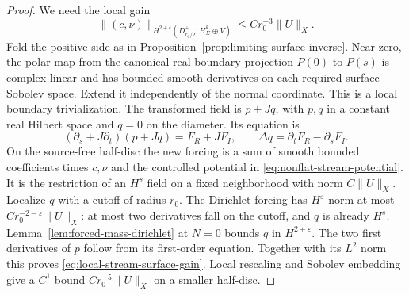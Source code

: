 \documentclass[11pt]{amsart}
\theoremstyle{definition}
\theoremstyle{remark}
\theoremstyle{plain}
\begin{document}
\begin{proof}
We need the local gain
\begin{equation}\label{eq:local-stream-surface-gain}
 \|(c,\nu)\|_{H^{2+\varepsilon}(D_{r_0/2}^+;
                                      H_\Sigma^k\oplus V)}
                                  \leq Cr_0^{-3}\|U\|_X.
\end{equation}
Fold the positive side as in
Proposition~\ref{prop:limiting-surface-inverse}.
Near zero, the polar map from the canonical real boundary
projection $P(0)$ to $P(s)$ is complex linear and has bounded
smooth derivatives on each required surface Sobolev space.
Extend it independently of the normal coordinate. This is a
local boundary trivialization. The transformed field is
$p+Jq$, with $p,q$ in a constant real Hilbert space and $q=0$
on the diameter. Its equation is
\[
 (\partial_s+J\partial_t)(p+Jq)=F_R+JF_I,\qquad
              \Delta q=\partial_tF_R-\partial_sF_I.
\]
On the source-free half-disc the new forcing is a sum of smooth
bounded coefficients times $c,\nu$ and the controlled potential
in \eqref{eq:nonflat-stream-potential}. It is the restriction
of an $H^s$ field on a fixed neighborhood with norm
$C\|U\|_X$. Localize $q$ with a cutoff of radius $r_0$.
The Dirichlet forcing has $H^\varepsilon$ norm at most
$Cr_0^{-2-\varepsilon}\|U\|_X$: at most two derivatives fall
on the cutoff, and $q$ is already $H^s$.
Lemma~\ref{lem:forced-mass-dirichlet} at $N=0$ bounds $q$
in $H^{2+\varepsilon}$. The two first derivatives of $p$
follow from its first-order equation. Together with its
$L^2$ norm this proves \eqref{eq:local-stream-surface-gain}.
Local rescaling and Sobolev embedding give a $C^1$ bound
$Cr_0^{-5}\|U\|_X$ on a smaller half-disc.


\end{proof}
\end{document}
